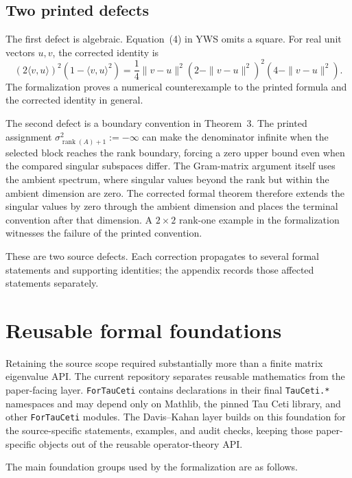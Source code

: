 \documentclass[11pt]{article}
\begin{document}
\subsection{Two printed defects}

The first defect is algebraic.  Equation~(4) in YWS omits a square.  For real
unit vectors $u,v$, the corrected identity is
\begin{equation}
(2\langle v,u\rangle)^2(1-\langle v,u\rangle^2)
=
\frac14\|v-u\|^2(2-\|v-u\|^2)^2(4-\|v-u\|^2).
\label{eq:yws-equation4-corrected}
\end{equation}
The formalization proves a numerical counterexample to the printed formula and
the corrected identity in general.

The second defect is a boundary convention in Theorem~3.  The printed
assignment
$\sigma^2_{\operatorname{rank}(A)+1}:=-\infty$ can make the denominator
infinite when the selected block reaches the rank boundary, forcing a zero
upper bound even when the compared singular subspaces differ.  The Gram-matrix
argument itself uses the ambient spectrum, where singular values beyond the
rank but within the ambient dimension are zero.  The corrected formal theorem
therefore extends the singular values by zero through the ambient dimension and
places the terminal convention after that dimension.  A $2\times2$ rank-one
example in the formalization witnesses the failure of the printed convention.

These are two source defects.  Each correction propagates to several formal
statements and supporting identities; the appendix records those affected
statements separately.

\section{Reusable formal foundations}
\label{sec:foundations}

Retaining the source scope required substantially more than a finite matrix
eigenvalue API.  The current repository separates reusable mathematics from the
paper-facing layer.  \texttt{ForTauCeti} contains declarations in their final
\texttt{TauCeti.*} namespaces and may depend only on Mathlib, the pinned Tau Ceti
library, and other \texttt{ForTauCeti} modules.  The Davis--Kahan layer builds
on this foundation for the source-specific statements, examples, and audit
checks, keeping those paper-specific objects out of the reusable operator-theory
API.

The main foundation groups used by the formalization are as follows.
\end{document}
